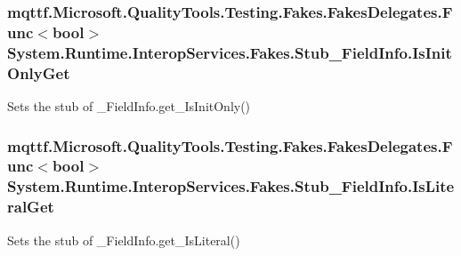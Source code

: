 \hypertarget{class_system_1_1_runtime_1_1_interop_services_1_1_fakes_1_1_stub___field_info_a55b5aa727ce4a220898669830ddb4fba}{
\subsubsection[{Is\-Init\-Only\-Get}]{\setlength{\rightskip}{0pt plus 5cm}mqttf.\-Microsoft.\-Quality\-Tools.\-Testing.\-Fakes.\-Fakes\-Delegates.\-Func$<$bool$>$ System.\-Runtime.\-Interop\-Services.\-Fakes.\-Stub\-\_\-\-Field\-Info.\-Is\-Init\-Only\-Get}}\label{class_system_1_1_runtime_1_1_interop_services_1_1_fakes_1_1_stub___field_info_a55b5aa727ce4a220898669830ddb4fba}


Sets the stub of \-\_\-\-Field\-Info.\-get\-\_\-\-Is\-Init\-Only()

\hypertarget{class_system_1_1_runtime_1_1_interop_services_1_1_fakes_1_1_stub___field_info_a66efb51cffa85f3981440b031cd964e4}{
\subsubsection[{Is\-Literal\-Get}]{\setlength{\rightskip}{0pt plus 5cm}mqttf.\-Microsoft.\-Quality\-Tools.\-Testing.\-Fakes.\-Fakes\-Delegates.\-Func$<$bool$>$ System.\-Runtime.\-Interop\-Services.\-Fakes.\-Stub\-\_\-\-Field\-Info.\-Is\-Literal\-Get}}\label{class_system_1_1_runtime_1_1_interop_services_1_1_fakes_1_1_stub___field_info_a66efb51cffa85f3981440b031cd964e4}


Sets the stub of \-\_\-\-Field\-Info.\-get\-\_\-\-Is\-Literal()

